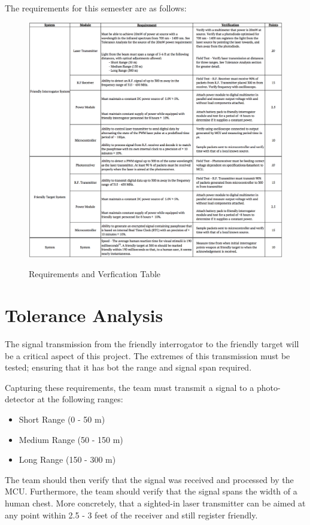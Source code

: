 \documentclass[openbib,letterpaper,10pt]{article}
\begin{document}
\begin{spacing}{1.15}
The requirements for this semester are as follows: 
\begin{figure} [H]
	\centering
	\includegraphics[scale=0.54]{Requirements-Verification-Table.png}
	\label{fig:brequirements-table}
	\caption{Requirements and Verfication Table}
\end{figure}

\section{Tolerance Analysis}
The signal transmission from the friendly interrogator to the friendly target will be a critical aspect of this project. The extremes of this transmission must be tested; ensuring that it has bot the range and signal span required. 

Capturing these requirements, the team must transmit a signal to a photo-detector at the following ranges:
		\begin{itemize}
			\item Short Range (0 - 50 m)
			\item Medium Range (50 - 150 m)
			\item Long Range (150 - 300 m)
		\end{itemize}

The team should then verify that the signal was received and processed by the MCU. Furthermore, the team should verify that the signal spans the width of a human chest. More concretely, that a sighted-in laser transmitter can be aimed at any point within 2.5 - 3 feet of the receiver and still register friendly. 


\end{spacing}
\end{document}
